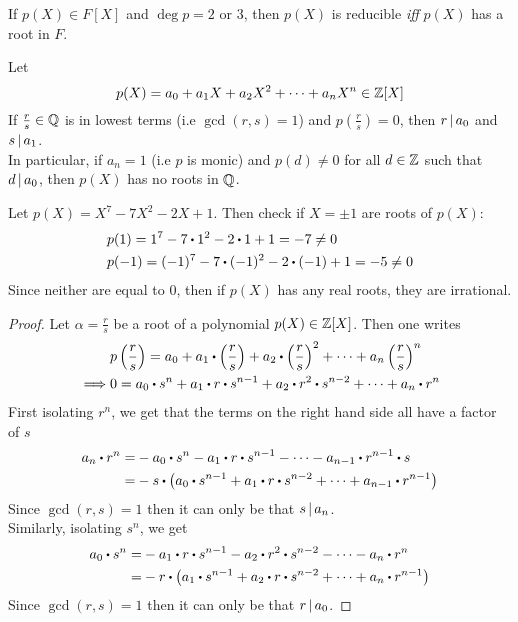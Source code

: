 \documentclass[../Main.tex]{subfiles}
\begin{document}
\begin{crl}[title = Quadratics and cubics reducible \textit{iff} they have roots in \texorpdfstring{$F$}{F},label=14.5]
	If $p(X)\in F[X]$ and $\deg p = 2$ or $3$, then $p(X)$ is reducible \textit{iff} $p(X)$ has a root in $F$.
\end{crl}
\begin{prop}[title= Rational Root Theorem,label=rational]
	Let 
	\[p(X)=a_0+a_1X+a_2X^2+\dots+a_nX^n\in \mathbb{Z}[X]\]
	If $\frac{r}{s}\in \mathbb{Q}$ is in lowest terms (i.e $\gcd(r,s)=1$) and $p\left(\frac{r}{s}\right)=0$, then $r \, | \, a_0$ and $s \, | \, a_1$.\\
	In particular, if $a_n=1$ (i.e $p$ is monic) and $p(d)\ne 0$ for all $d \in \mathbb{Z}$ such that $d \, | \, a_0$, then $p(X)$ has no roots in $\mathbb{Q}$.
\end{prop}
\begin{example}
	Let $p(X) = X^7-7X^2-2X+1$. Then check if $X=\pm 1$ are roots of $p(X)$:
	\begin{align*}
	&p(1)=1^7-7\rdot 1^2-2\rdot 1+1=-7\ne 0\\
	&p(-1)=(-1)^7-7\rdot (-1)^2-2\rdot (-1)+1=-5\ne 0
	\end{align*}
	Since neither are equal to $0$, then if $p(X)$ has any real roots, they are irrational.
\end{example}
\begin{proof}
	Let $\alpha=\frac{r}{s}$ be a root of a polynomial $p(X) \in \mathbb{Z}[X]$. Then one writes
	\begin{align*}
		&p\left(\frac{r}{s}\right)=a_0+a_1\rdot \left(\frac{r}{s}\right)+a_2\rdot \left(\frac{r}{s}\right)^2+\dots + a_n \left(\frac{r}{s}\right)^n\\
		\implies& 0 = a_0\rdot s^n +a_1\rdot r\rdot s^{n-1}+a_2\rdot r^2\rdot s^{n-2}+\dots+a_n\rdot r^n
	\end{align*}
	First isolating $r^n$, we get that the terms on the right hand side all have a factor of $s$
	\begin{align*}
	a_n\rdot r^n =& -a_0 \rdot s^n-a_1\rdot r\rdot s^{n-1}-\dots-a_{n-1}\rdot r^{n-1}\rdot s \\
	=& -s \rdot \left(a_0\rdot s^{n-1}+a_1\rdot r\rdot s^{n-2}+\dots+a_{n-1}\rdot r^{n-1}\right)
	\end{align*}
	Since $\gcd(r,s)=1$ then it can only be that $s \, | \, a_n$.\\
	Similarly, isolating $s^n$, we get
	\begin{align*}
	a_0\rdot s^n =& -a_1\rdot r\rdot s^{n-1}-a_2\rdot r^2\rdot s^{n-2}-\dots-a_n\rdot r^n\\
	=& -r\rdot \left(a_1\rdot s^{n-1}+a_2\rdot r\rdot s^{n-2}+\dots+a_n\rdot r^{n-1}\right)
	\end{align*}
	Since $\gcd(r,s)=1$ then it can only be that $r \, | \, a_0$.
\end{proof}
\end{document}
